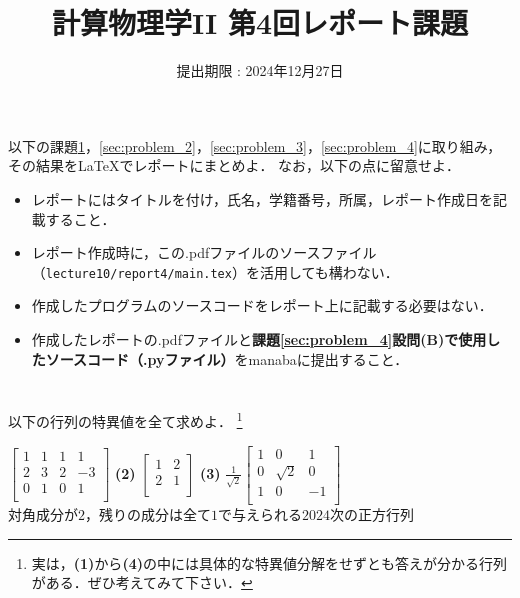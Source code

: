 \documentclass[a4paper,12pt]{jsarticle}
\title{計算物理学II 第4回レポート課題}
\date{提出期限 : 2024年12月27日}
\begin{document}
\maketitle

以下の課題\ref{sec:problem_1}，\ref{sec:problem_2}，\ref{sec:problem_3}，\ref{sec:problem_4}に取り組み，その結果を\LaTeX でレポートにまとめよ．
なお，以下の点に留意せよ．
\begin{itemize}
    \item レポートにはタイトルを付け，氏名，学籍番号，所属，レポート作成日を記載すること．
    \item レポート作成時に，この.pdfファイルのソースファイル（\texttt{lecture10/report4/main.tex}）を活用しても構わない．
    \item 作成したプログラムのソースコードをレポート上に記載する必要はない．
    \item 作成したレポートの.pdfファイルと{\bf 課題\ref{sec:problem_4}設問(B)で使用したソースコード（.pyファイル）}をmanabaに提出すること．
\end{itemize}

\section{}
\label{sec:problem_1}

以下の行列の特異値を全て求めよ．
\footnote{実は，{\bf (1)}から{\bf (4)}の中には具体的な特異値分解をせずとも答えが分かる行列がある．ぜひ考えてみて下さい．}
\\

\begin{flushleft}
\qquad{}
$\displaystyle
    \begin{bmatrix}
        1 & 1 & 1 & 1 \\
        2 & 3 & 2 & -3 \\
        0 & 1 & 0 & 1 \\
    \end{bmatrix}
$
\qquad
{\bf (2)}
$\displaystyle
    \begin{bmatrix}
        1 & 2 \\
        2 & 1 \\
    \end{bmatrix}
$
\qquad
{\bf (3)}
$\displaystyle
    \frac{1}{\sqrt{2}}
    \begin{bmatrix}
        1 & 0 & 1  \\
        0 & \sqrt{2} & 0  \\
        1 & 0 & -1  \\
    \end{bmatrix}
$
\newline\newline\\

\qquad{}
対角成分が$2$，残りの成分は全て$1$で与えられる$2024$次の正方行列
\end{flushleft}
\end{document}
